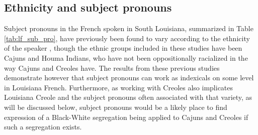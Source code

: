 \documentclass{article}\usepackage[]{graphicx}\usepackage[]{xcolor}
\newcommand{\lexi}[1]{\textit{#1}}
\begin{document}
    \subsection{Ethnicity and subject pronouns}
      Subject pronouns in the French spoken in South Louisiana, summarized in Table \ref{tab:lf_sub_pro}, have previously been found to vary according to the ethnicity of the speaker \parencite{rottet_language_1995, dajko_ethnic_2009}, though the ethnic groups included in these studies have been Cajuns and Houma Indians, who have not been oppositionally racialized in the way Cajuns and Creoles have.
      The results from these previous studies demonstrate however that subject pronouns can work as indexicals on some level in Louisiana French.
      Furthermore, as working with Creoles also implicates Louisiana Creole and the subject pronouns often associated with that variety, as will be discussed below, subject pronouns would be a likely place to find expression of a Black-White segregation being applied to Cajuns and Creoles if such a segregation exists.

\end{document}
